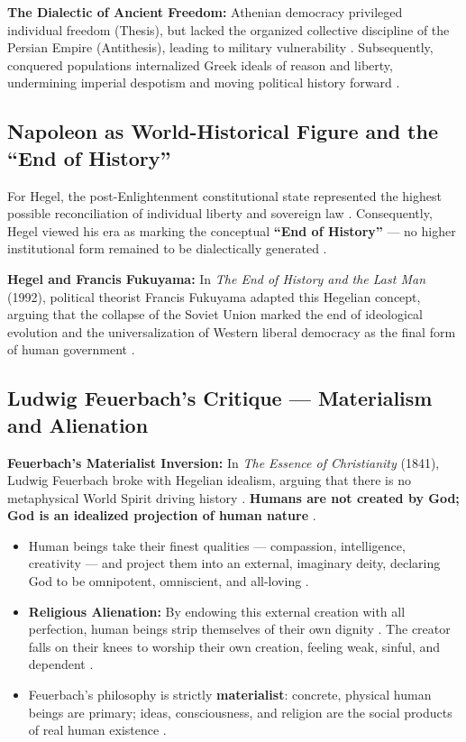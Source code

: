 \begin{ExampleBox}
\textbf{The Dialectic of Ancient Freedom:}
Athenian democracy privileged individual freedom (Thesis), but lacked the organized collective discipline of the Persian Empire (Antithesis), leading to military vulnerability . Subsequently, conquered populations internalized Greek ideals of reason and liberty, undermining imperial despotism and moving political history forward .
\end{ExampleBox}

\subsection{Napoleon as World-Historical Figure and the ``End of History''}

For Hegel, the post-Enlightenment constitutional state represented the highest possible reconciliation of individual liberty and sovereign law . Consequently, Hegel viewed his era as marking the conceptual \textbf{``End of History''} --- no higher institutional form remained to be dialectically generated .

\begin{ComparisonBox}
\textbf{Hegel and Francis Fukuyama:}
In \textit{The End of History and the Last Man} (1992), political theorist Francis Fukuyama adapted this Hegelian concept, arguing that the collapse of the Soviet Union marked the end of ideological evolution and the universalization of Western liberal democracy as the final form of human government .
\end{ComparisonBox}

\subsection{Ludwig Feuerbach's Critique --- Materialism and Alienation}

\begin{KeyConcept}
\textbf{Feuerbach's Materialist Inversion:}
In \textit{The Essence of Christianity} (1841), Ludwig Feuerbach broke with Hegelian idealism, arguing that there is no metaphysical World Spirit driving history . \textbf{Humans are not created by God; God is an idealized projection of human nature} .
\end{KeyConcept}

\begin{itemize}
    \item Human beings take their finest qualities --- compassion, intelligence, creativity --- and project them into an external, imaginary deity, declaring God to be omnipotent, omniscient, and all-loving .
    \item \textbf{Religious Alienation:} By endowing this external creation with all perfection, human beings strip themselves of their own dignity . The creator falls on their knees to worship their own creation, feeling weak, sinful, and dependent .
    \item Feuerbach's philosophy is strictly \textbf{materialist}: concrete, physical human beings are primary; ideas, consciousness, and religion are the social products of real human existence .
\end{itemize}

